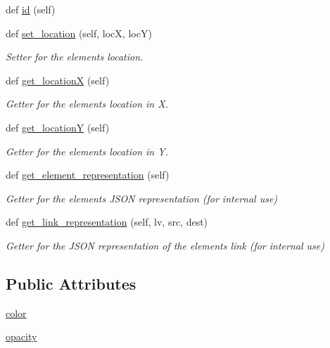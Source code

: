 \begin{DoxyCompactItemize}
def \hyperlink{classbridges_1_1element_1_1_element_aef2ce692ffbd43304790b594e6a6dc66}{id} (self)
\item 
def \hyperlink{classbridges_1_1element_1_1_element_aa1387621f7afa6b6f6acd052a1126320}{set\+\_\+location} (self, locX, locY)
\begin{DoxyCompactList}\small\item\em Setter for the element\textquotesingle{}s location. \end{DoxyCompactList}\item 
def \hyperlink{classbridges_1_1element_1_1_element_aa921953dab3cec5253e813bb1709895a}{get\+\_\+locationX} (self)
\begin{DoxyCompactList}\small\item\em Getter for the element\textquotesingle{}s location in X. \end{DoxyCompactList}\item 
def \hyperlink{classbridges_1_1element_1_1_element_a108f62843d084beaf5fcf5fd202853c5}{get\+\_\+locationY} (self)
\begin{DoxyCompactList}\small\item\em Getter for the element\textquotesingle{}s location in Y. \end{DoxyCompactList}\item 
def \hyperlink{classbridges_1_1element_1_1_element_a511fbc6323616d806ae0ae33010f4654}{get\+\_\+element\+\_\+representation} (self)
\begin{DoxyCompactList}\small\item\em Getter for the element\textquotesingle{}s J\+S\+ON representation (for internal use) \end{DoxyCompactList}\item 
def \hyperlink{classbridges_1_1element_1_1_element_a8f220d7b81c0e0dd84b9eff33ade76b9}{get\+\_\+link\+\_\+representation} (self, lv, src, dest)
\begin{DoxyCompactList}\small\item\em Getter for the J\+S\+ON representation of the element\textquotesingle{}s link (for internal use) \end{DoxyCompactList}\end{DoxyCompactItemize}
\subsection*{Public Attributes}
\begin{DoxyCompactItemize}
\item 
\hyperlink{classbridges_1_1element_1_1_element_a568fd16a353d7852571aa947433095ea}{color}
\item 
\hyperlink{classbridges_1_1element_1_1_element_a5af50d5fc696eb8c295245bd5d1c0c91}{opacity}
\end{DoxyCompactItemize}
